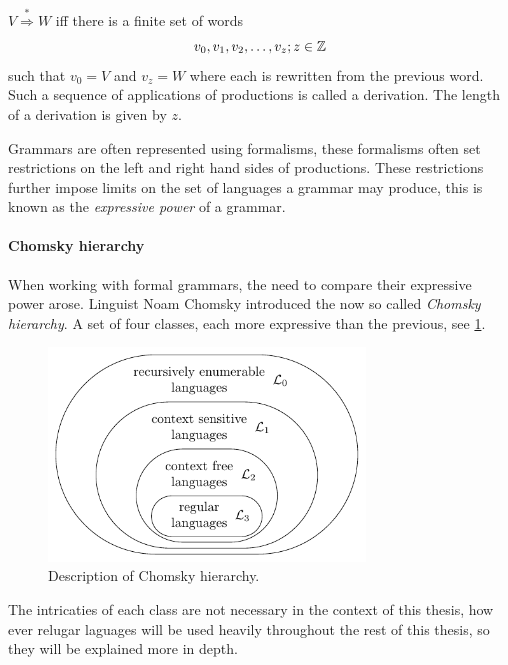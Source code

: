 \begin{definition}[Derivation]
\label{def:derivation}
$V \stackrel{*}{\Rightarrow}  W$ iff there is a finite set of words 
$$ v_0, v_1, v_2, \dots, v_z;\medskip z \in \mathbb{Z}$$
such that $v_0 = V$ and $v_z = W$ where each is rewritten from the previous word. Such a sequence of applications of productions is called a derivation.
The length of a derivation is given by $z$. 
\end{definition}

Grammars are often represented using formalisms, these formalisms often set restrictions on the left and right hand sides of productions. These restrictions further impose limits on the set of languages a grammar may produce, this is known as the \emph{expressive power} of a grammar. 

\paragraph{Chomsky hierarchy}
When working with formal grammars, the need to compare their expressive power arose. Linguist Noam Chomsky introduced the now so called \emph{Chomsky hierarchy}\cite{chomsky1956three}. A set of four classes, each more expressive than the previous, see \cref{fig:chomsky-hierarchy}.



\begin{figure}[h]
  \caption{Description of Chomsky hierarchy.}
  \label{fig:chomsky-hierarchy}
  \centering
  \includegraphics[width=0.75\textwidth]{figures/chomsky-hierarchy.pdf}
\end{figure}

The intricaties of each class are not necessary in the context of this thesis, how ever relugar laguages will be used heavily throughout the rest of this thesis, so they will be explained more in depth.

